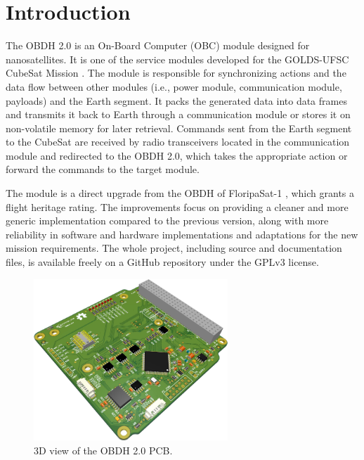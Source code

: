 %
%
%
%
%

%
%
%
%
%
%

\chapter{Introduction} \label{ch:introduction}

The OBDH 2.0 is an On-Board Computer (OBC) module designed for nanosatellites. It is one of the service modules developed for the GOLDS-UFSC CubeSat Mission \cite{floripasat2}. The module is responsible for synchronizing actions and the data flow between other modules (i.e., power module, communication module, payloads) and the Earth segment. It packs the generated data into data frames and transmits it back to Earth through a communication module or stores it on non-volatile memory for later retrieval. Commands sent from the Earth segment to the CubeSat are received by radio transceivers located in the communication module and redirected to the OBDH 2.0, which takes the appropriate action or forward the commands to the target module.

The module is a direct upgrade from the OBDH of FloripaSat-1 \cite{obdh-fsat}, which grants a flight heritage rating. The improvements focus on providing a cleaner and more generic implementation compared to the previous version, along with more reliability in software and hardware implementations and adaptations for the new mission requirements. The whole project, including source and documentation files, is available freely on a GitHub repository \cite{obdh2-repo} under the GPLv3 license.


\begin{figure}[!ht]
    \begin{center}
        \includegraphics[width=0.65\textwidth]{figures/obdh2-pcb-3d.png}
        \caption{3D view of the OBDH 2.0 PCB.}
        \label{fig:pcb-3d}
    \end{center}
\end{figure}
